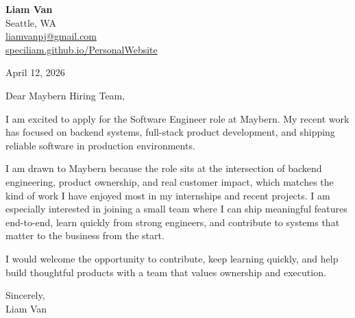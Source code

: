 \documentclass[letterpaper,11pt]{article}
\begin{document}
\begin{flushleft}
\textbf{\Large Liam Van} \\
Seattle, WA \\
\href{mailto:liamvanpj@gmail.com}{liamvanpj@gmail.com} \\
\href{https://speciliam.github.io/PersonalWebsite}{speciliam.github.io/PersonalWebsite}
\end{flushleft}

April 12, 2026

\noindent Dear Maybern Hiring Team,

\noindent I am excited to apply for the Software Engineer role at Maybern. My recent work has focused on backend systems, full-stack product development, and shipping reliable software in production environments.

\noindent I am drawn to Maybern because the role sits at the intersection of backend engineering, product ownership, and real customer impact, which matches the kind of work I have enjoyed most in my internships and recent projects. I am especially interested in joining a small team where I can ship meaningful features end-to-end, learn quickly from strong engineers, and contribute to systems that matter to the business from the start.

\noindent I would welcome the opportunity to contribute, keep learning quickly, and help build thoughtful products with a team that values ownership and execution.

\noindent Sincerely, \\
Liam Van
\end{document}

